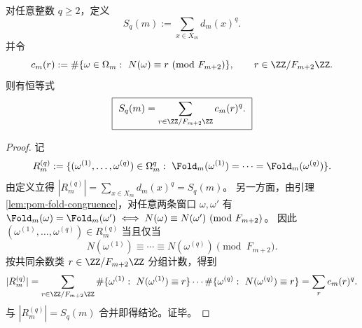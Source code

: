 

\begin{proposition}\label{prop:pom-moment-congruence-q}
对任意整数 \(q\ge 2\)，定义
$$
S_q(m):=\sum_{x\in X_m} d_m(x)^q.
$$
并令
$$
c_m(r):=\#\{\omega\in\Omega_m:\ N(\omega)\equiv r\ (\mathrm{mod}\ F_{m+2})\},\qquad r\in\ZZ/F_{m+2}\ZZ.
$$
则有恒等式
$$
\boxed{\
S_q(m)=\sum_{r\in\ZZ/F_{m+2}\ZZ} c_m(r)^q.
\ }
$$
\end{proposition}
\begin{proof}
记
$$
R_m^{(q)}:=\{(\omega^{(1)},\dots,\omega^{(q)})\in\Omega_m^q:\ \Fold_m(\omega^{(1)})=\cdots=\Fold_m(\omega^{(q)})\}.
$$
由定义立得 \(|R_m^{(q)}|=\sum_{x\in X_m}d_m(x)^q=S_q(m)\)。
另一方面，由引理 \ref{lem:pom-fold-congruence}，对任意两条窗口 \(\omega,\omega'\) 有
\(
\Fold_m(\omega)=\Fold_m(\omega')\iff N(\omega)\equiv N(\omega')\ (\mathrm{mod}\ F_{m+2})
\)。
因此 \((\omega^{(1)},\dots,\omega^{(q)})\in R_m^{(q)}\) 当且仅当
$$
N(\omega^{(1)})\equiv \cdots \equiv N(\omega^{(q)})\pmod{F_{m+2}}.
$$
按共同余数类 \(r\in\ZZ/F_{m+2}\ZZ\) 分组计数，得到
$$
|R_m^{(q)}|
=\sum_{r\in\ZZ/F_{m+2}\ZZ}\#\{\omega^{(1)}:\ N(\omega^{(1)})\equiv r\}\cdots \#\{\omega^{(q)}:\ N(\omega^{(q)})\equiv r\}
=\sum_{r}c_m(r)^q.
$$
与 \(|R_m^{(q)}|=S_q(m)\) 合并即得结论。证毕。
\end{proof}



